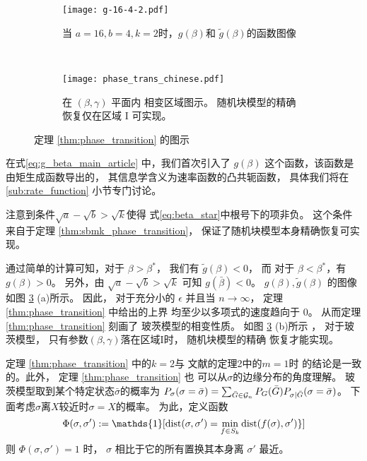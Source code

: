 \begin{figure}[H]
	\begin{subfigure}{0.43\textwidth}
		\texttt{[image: g-16-4-2.pdf]}
		\caption{当 $a=16,b=4,k=2$时，$g(\beta)$和
		$\tilde{g}(\beta)$的函数图像}\label{fig:g}
	\end{subfigure}~
	\begin{subfigure}{0.55\textwidth}
		\texttt{[image: phase\_trans\_chinese.pdf]}
		\caption{
			在 $(\beta, \gamma)$ 平面内
			相变区域图示。
			随机块模型的精确
			恢复仅在区域 I 可实现。}\label{fig:pt}
	\end{subfigure}
	\caption{定理 \ref{thm:phase_transition} 
	的图示}
	\label{fig:phase_transition_theorem_illustration}
\end{figure}
\begin{remark}
	在式\eqref{eq:g_beta_main_article} 中，我们首次引入了
	$g(\beta)$ 这个函数，该函数是由矩生成函数导出的，
	其信息学含义为速率函数的凸共轭函数，
	具体我们将在 \ref{sub:rate_function} 小节专门讨论。
\end{remark}
注意到条件$\sqrt{a} - \sqrt{b} > \sqrt{k}$使得
式\eqref{eq:beta_star}中根号下的项非负。
这个条件来自于定理 \ref{thm:sbmk_phase_transition}，
保证了随机块模型本身精确恢复可实现。


通过简单的计算可知，对于 $\beta> \beta^*$，
我们有 $\tilde{g}(\beta) < 0$，
而 对于 $\beta < \beta^*$，有
$g(\beta)>0$。
另外，由 $\sqrt{a} - \sqrt{b} > \sqrt{k}$ 可知
$g(\bar{\beta}) < 0$。
$g(\beta), \tilde{g}(\beta)$ 的图像
如图 \ref{fig:phase_transition_theorem_illustration} (a)所示。
因此， 对于充分小的
$\epsilon$ 并且当 $n \to \infty$，
定理 \ref{thm:phase_transition} 中给出的上界
均至少以多项式的速度趋向于 $0$。
从而定理 \ref{thm:phase_transition} 刻画了
玻茨模型的相变性质。
如图 \ref{fig:phase_transition_theorem_illustration} (b)所示
， 对于玻茨模型， 只有参数$(\beta, \gamma)$落在区域I时，
随机块模型的精确
恢复才能实现。



定理 \ref{thm:phase_transition} 中的$k=2$与
文献的定理2中的$m=1$时
的结论是一致的。此外，
定理 \ref{thm:phase_transition} 也
可以从$\sigma$的边缘分布的角度理解。
玻茨模型取到某个特定状态$\bar{\sigma}$的概率为
 $P_{\sigma}(\sigma =\bar{\sigma})
=\sum_{\bar{G} \in \mathcal{G}_n}P_G(\bar{G})
P_{\sigma |\bar{G}}(\sigma=\bar{\sigma})$。
下面考虑$\sigma$离$X$较近时$\sigma=X$的概率。
为此，定义函数
\begin{equation}
	\label{eq:D_sigma_sigma_prime}
\Phi(\sigma, \sigma') := \mathds{1} [ \Dist(\sigma, \sigma')  = \min_{f \in S_k} \Dist(f(\sigma), \sigma')  \}]
\end{equation}
则  $\Phi(\sigma, \sigma')=1$ 时， $\sigma$ 相比于它的所有置换其本身离 $\sigma'$ 最近。

